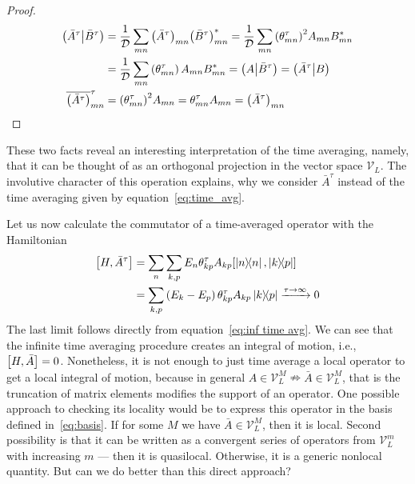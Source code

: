 \begin{proof}
  \begin{align*}
    \left(\bar{A}^{\tau} \middle| \bar{B}^{\tau}\right)  & = \frac{1}{\mathcal{D}} \sum_{mn} {\left(\bar{A}^{\tau}\right)}_{mn}
    {\left(\bar{B}^{\tau}\right)}_{mn}^{\ast} = \frac{1}{\mathcal{D}} \sum_{mn} {\left(\theta_{mn}^{\tau}\right)}^2 A_{mn} B_{mn}^{\ast} \nonumber{}  \\
    & = \frac{1}{\mathcal{D}} \sum_{mn} \left(\theta_{mn}^{\tau}\right) A_{mn} B_{mn}^{\ast} =
        \left(A \middle| \bar{B}^{\tau}\right) = \left(\bar{A}^{\tau} \middle| B\right)\\
    \overline{\left(\bar{A}^{\tau}\right)}_{mn}^{\tau} & = {\left(\theta_{mn}^{\tau}\right)}^2 A_{mn} = \theta_{mn}^{\tau} A_{mn} = \left(\bar{A}^{\tau}\right)_{mn}
  \end{align*}  
\end{proof}
These two facts reveal an interesting interpretation of the time averaging, namely, that it can be
thought of as an orthogonal projection in the vector space \(\mathcal{V}_L\). The involutive character of this operation explains,
why we consider \(\bar{A}^{\tau}\) instead of the time averaging given by equation~\eqref{eq:time_avg}.

Let us now calculate the commutator of a time-averaged operator with the Hamiltonian
\begin{align}
  \comm{H}{\bar{A}^{\tau}} & = \sum_n \sum_{k,p} E_n \theta_{kp}^{\tau} A_{kp} \comm{ \ketbra{n}{n}}{ \ketbra{k}{p}} \nonumber         \\
                           & = \sum_{k,p} \left(E_k-E_p\right) \theta_{kp}^{\tau} A_{kp} \ketbra{k}{p} \xrightarrow{\tau \to \infty} 0 \label{eq:time averaged commutator}
\end{align}
The last limit follows directly from equation~\eqref{eq:inf time avg}. We can see that the infinite time averaging procedure
creates an integral of motion, i.e., \(\comm{H}{\bar{A}} = 0\). Nonetheless, it is not enough to just time average a
local operator to get a local integral of motion, because in general \(A\in \mathcal{V}_L^M  \nRightarrow \bar{A} 
\in \mathcal{V}_L^M\), that is the truncation of matrix elements modifies the support of an operator.
One possible approach to checking its locality would be to
express this operator in the basis defined in~\eqref{eq:basis}. If for some \(M\) we have \(\bar{A}\in \mathcal{V}_L^M\),
then it is local. Second possibility is that it can be written as a convergent series of operators from \(\mathcal{V}_L^m\) with
increasing \(m\) --- then it is quasilocal. Otherwise, it is a generic nonlocal quantity. But can we do better than this
direct approach?

